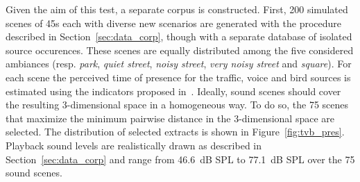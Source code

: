 \documentclass[twocolumn]{article}
\begin{document}
Given the aim of this test, a separate corpus is constructed. First, 200 simulated scenes of 45s each with diverse new scenarios are generated with the procedure described in Section~\ref{sec:data_corp}, though with a separate database of isolated source occurences. These scenes are equally distributed among the five considered ambiances (resp. \textit{park}, \textit{quiet street}, \textit{noisy street}, \textit{very noisy street} and \textit{square}). For each scene the perceived time of presence for the traffic, voice and bird sources is estimated using the indicators proposed in~\cite{gontier2018}. Ideally, sound scenes should cover the resulting 3-dimensional space in a homogeneous way. To do so, the 75 scenes that maximize the minimum pairwise distance in the 3-dimensional space are selected. The distribution of selected extracts is shown in Figure~\ref{fig:tvb_pres}. Playback sound levels are realistically drawn as described in Section~\ref{sec:data_corp} and range from 46.6~dB SPL to 77.1~dB SPL over the 75 sound scenes.
\end{document}
